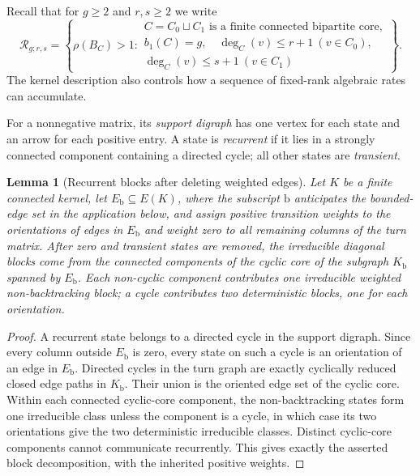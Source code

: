 \documentclass[11pt]{amsart}
\theoremstyle{plain}
\newtheorem{lemma}[theorem]{Lemma}
\theoremstyle{definition}
\theoremstyle{remark}
\begin{document}
Recall that for \(g\geq2\) and \(r,s\geq2\) we write
\[
  \mathcal R_{g;r,s}
  =
  \left\{\rho(B_C)>1:
  \begin{array}{l}
    C=C_0\sqcup C_1\text{ is a finite connected bipartite core},\\
    b_1(C)=g,\quad
    \deg_C(v)\leq r+1\ (v\in C_0),\\
    \deg_C(v)\leq s+1\ (v\in C_1)
  \end{array}\right\}.
\]
The kernel description also controls how a sequence of fixed-rank algebraic
rates can accumulate.

For a nonnegative matrix, its \emph{support digraph} has one vertex for each
state and an arrow for each positive entry.  A state is \emph{recurrent} if it
lies in a strongly connected component containing a directed cycle; all other
states are \emph{transient}.

\begin{lemma}[Recurrent blocks after deleting weighted edges]
\label{lem:recurrent-bounded-core}
Let \(K\) be a finite connected kernel, let \(E_{\mathrm b}\subseteq E(K)\),
where the subscript \({\mathrm b}\) anticipates the bounded-edge set in
the application below, and assign positive transition weights to the orientations of edges in
\(E_{\mathrm b}\) and weight zero to all remaining columns of the turn
matrix.  After zero and transient states are removed, the irreducible diagonal
blocks come from the connected components of the cyclic core of the subgraph
\(K_{\mathrm b}\) spanned by \(E_{\mathrm b}\).  Each non-cyclic component
contributes one irreducible weighted non-backtracking block; a cycle
contributes two deterministic blocks, one for each orientation.
\end{lemma}

\begin{proof}
A recurrent state belongs to a directed cycle in the support digraph.  Since
every column outside \(E_{\mathrm b}\) is zero, every state on such a cycle is
an orientation of an edge in \(E_{\mathrm b}\).  Directed cycles in the turn
graph are exactly cyclically reduced closed edge paths in
\(K_{\mathrm b}\).  Their union is the oriented edge set of the cyclic core.
Within each connected cyclic-core component, the non-backtracking states form
one irreducible class unless the component is a cycle, in which case its two
orientations give the two deterministic irreducible classes.  Distinct
cyclic-core components cannot communicate recurrently.  This gives exactly
the asserted block decomposition, with the inherited positive weights.
\end{proof}
\end{document}
